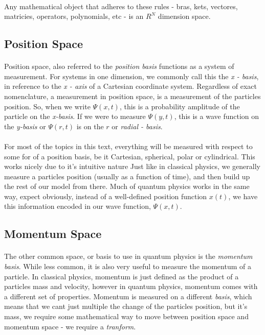 \documentclass[12pt,letterpaper]{book}
\begin{document}
\paragraph*{}Any mathematical object that adheres to these rules - bras, kets, vectores, matricies, operators, polynomials, etc - is an $R^N$ dimension space.


\subsection*{Position Space}
\paragraph*{}Position space, also referred to the \textit{position basis} functions as a system of measurement. For systems in one dimension, we commonly call this the \textit{x - basis}, in reference to the \textit{x - axis} of a Cartesian coordinate system. Regardless of exact nomenclature, a measurement in position space, is a measurement of the particles position. So, when we write $\Psi(x,t)$, this is a probability amplitude of the particle on the \textit{x-basis}. If we were to measure $\Psi(y,t)$, this is a wave function on the \textit{y-basis} or $\Psi(r,t)$ is on the $r$ or \textit{radial - basis}.
\paragraph*{}For most of the topics in this text, everything will be measured with respect to some for of a position basis, be it Cartesian, spherical, polar or cylindrical. This works nicely due to it's intuitive nature Just like in classical physics, we generally measure a particles position (usually as a function of time), and then build up the rest of our model from there. Much of quantum physics works in the same way, expect obviously, instead of a well-defined position function $x(t)$, we have this information encoded in our wave function,
$\Psi(x,t)$.


\subsection*{Momentum Space}
\paragraph*{}The other common space, or basis to use in quantum physics is the \textit{momentum basis}. While less common, it is also very useful to measure the momentum of a particle. In classical physics, momentum is just defined as the product of a particles mass and velocity,  however in quantum physics, momentum comes with a different set of properties. Momentum is measured on a different \textit{basis}, which means that we cant just multiple the change of the particles position, but it's mass, we require some mathematical way to move between position space and momentum space - we require a \textit{tranform}.
\end{document}

